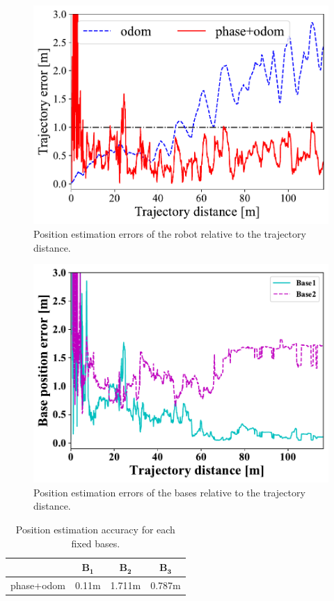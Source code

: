 \documentclass[a4jsme]{jsmepaper}
\begin{document}
\begin{figure}
    \centering
    \includegraphics[width=0.95\linewidth]{figures/robosym_online_rover_position_error.pdf}
    \caption{Position estimation errors of the robot relative to the trajectory distance.}
    \label{fig:error_real}
\end{figure}
\begin{figure}
    \centering
    \includegraphics[width=0.95\linewidth]{figures/robosym_online_base_position_error.pdf}
    \caption{Position estimation errors of the bases relative to the trajectory distance.}
    \label{fig:error_base}
\end{figure}
\begin{table}
    \centering
    \caption{Position estimation accuracy for each fixed bases.}
    \begin{tabular}{|c|c|c|c|}
    \hline    
    &$\mathbf{B_1}$ & $\mathbf{B_2}$ & $\mathbf{B_3}$ \\
    \hline    
    phase+odom&0.11m  &1.711m &0.787m \\
    \hline
    \end{tabular}
    \label{tab:base_error}
\end{table}
\end{document}
